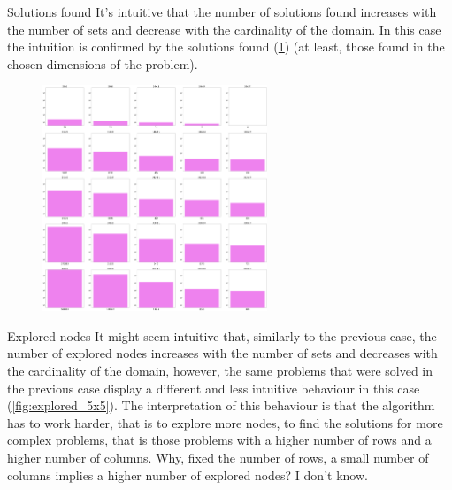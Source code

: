 \documentclass{beamer}
\begin{document}
\begin{frame}{Solutions found}
    It's intuitive that the number of solutions found increases
    with the number of sets and decrease with the cardinality of the domain.
    In this case the intuition is confirmed by the solutions found (\ref{fig:sol_5x5}) (at least, those
    found in the chosen dimensions of the problem).
\end{frame}

\begin{frame}
    \begin{figure}
        \centering
        \includegraphics[width=0.6\textwidth]{sol_5x5.pdf}
        \label{fig:sol_5x5}
    \end{figure}
\end{frame}

\begin{frame}{Explored nodes}
    It might seem intuitive that, similarly to the previous case, the number of explored nodes
    increases with the number of sets and decreases with the cardinality of the domain,
    however, the same problems that were solved in the previous case display a different
    and less intuitive behaviour in this case (\ref{fig:explored_5x5}).
    The interpretation of this behaviour is that the algorithm has to work harder,
    that is to explore more nodes, to find the solutions for more complex problems, that
    is those problems with a higher number of rows and a higher number of columns.
    Why, fixed the number of rows, a small number of columns implies a higher
    number of explored nodes? I don't know.
\end{frame}
\end{document}
